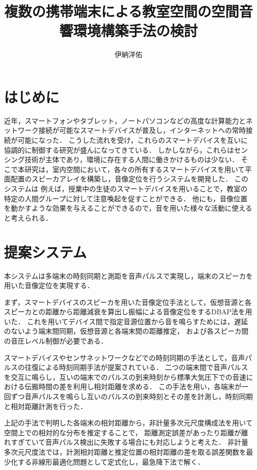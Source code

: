 \documentclass[11pt]{jarticle}
\title{複数の携帯端末による教室空間の空間音響環境構築手法の検討}
\author{伊納洋佑}
\begin{document}
\maketitle

\section{はじめに}

近年，スマートフォンやタブレット，ノートパソコンなどの高度な計算能力とネットワーク接続が可能なスマートデバイスが普及し，インターネットへの常時接続が可能になった．
こうした流れを受け，これらのスマートデバイスを互いに協調的に制御する研究が盛んになってきている\cite{shibata14}．
しかしながら，これらはセンシング技術が主体であり，環境に存在する人間に働きかけるものは少ない．
そこで本研究は，室内空間において，各々の所有するスマートデバイスを用いて平面配置のスピーカアレイを構築し，音像定位を行うシステムを開発した．
このシステムは
例えば，授業中の生徒のスマートデバイスを用いることで，教室の特定の人間グループに対して注意喚起を促すことができる．
他にも，音像位置を動かすような効果を与えることができるので，音を用いた様々な活動に使えると考えられる．

\section{提案システム}

本システムは多端末の時刻同期と測距を音声パルスで実現し，端末のスピーカを用いた音像定位を実現する．


まず，スマートデバイスのスピーカを用いた音像定位手法として，仮想音源と各スピーカとの距離から距離減衰を算出し振幅による音像定位をするDBAP法を用いた\cite{dbap}．
これを用いてデバイス間で指定音源位置から音を鳴らすためには，遅延のないよう端末間同期，仮想音源と各端末間の距離推定，
および各スピーカ間の音圧レベル制御が必要である．


スマートデバイスやセンサネットワークなどでの時刻同期の手法として，音声パルスの往復による時刻同期手法が提案されている\cite{tpsn}．
二つの端末間で音声パルスを交互に鳴らし，互いの端末でのパルスの到来時刻から標準大気圧下での音速における伝搬時間の差を利用し相対距離を求める．
この手法を用い，各端末が一回ずつ音声パルスを鳴らし互いのパルスの到来時刻とその差を計測し，時刻同期と相対距離計測を行った．


上記の手法で判明した各端末の相対距離から，非計量多次元尺度構成法を用いて空間上での相対的な分布を推定することで，
距離測定誤差があったり距離が離れすぎていて音声パルス検出に失敗する場合にも対応しようと考えた．
非計量多次元尺度法では，計測相対距離と推定位置の相対距離の差を取る誤差関数を最少化する非線形最適化問題として定式化し，最急降下法で解く．
\end{document}
